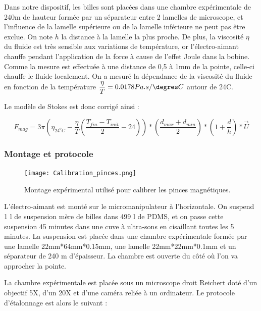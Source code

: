  Dans notre dispositif, les billes sont placées dans une chambre expérimentale de 240\micro m de hauteur formée par un séparateur entre 2 lamelles de microscope, et l'influence de la lamelle supérieure ou de la lamelle inférieure ne peut pas être exclue. On note $h$ la distance à la lamelle la plus proche. 
 De plus, la viscosité $\eta$ du fluide est très sensible aux variations de température, or l'électro-aimant chauffe pendant l'application de la force à cause de l'effet Joule dans la bobine. 
 Comme la mesure est effectuée à une distance de 0,5 à 1mm de la pointe, celle-ci chauffe le fluide localement. 
 On a mesuré la dépendance de la viscosité du fluide en fonction de la température $\dfrac{\eta}{T}=0.0178 Pa.s/\degres C$ autour de 24\degres C. 
 
 Le modèle de Stokes est donc corrigé ainsi : 
 
 \begin{equation}
 {F}_{mag}= 3 \pi \left(\eta_{24^{o}C}-\dfrac{\eta}{T}\left(\frac{T_{fin}-T_{init}}{2} - 24\right) \right) *\left( \frac{d_{max}+d_{min}}{2} \right) * \left( 1+\frac{d}{h} \right)*\vec{U}
 \label{Stokes_corr}
 \end{equation}
 
 \subsubsection{Montage et protocole}
 
 \begin{figure}
 \texttt{[image: Calibration\_pinces.png]}
 \caption{Montage expérimental utilisé pour calibrer les pinces magnétiques.}
 \label{calibration_pinces}
 \end{figure}
 

 
 L'électro-aimant est monté sur le micromanipulateur à l'horizontale.  
 On suspend 1 \micro l de suspension mère de billes dans 499 \micro l de PDMS, et on passe cette suspension 45 minutes dans une cuve à ultra-sons en cisaillant toutes les 5 minutes.
 La suspension est placée dans une chambre expérimentale formée par une lamelle 22mm*64mm*0.15mm, une lamelle 22mm*22mm*0.1mm et un séparateur de 240 \micro m d'épaisseur. La chambre est ouverte du côté où l'on va approcher la pointe. 
 
 La chambre expérimentale est placée sous un microscope droit Reichert doté d'un objectif 5X, d'un 20X et d'une caméra reliée à un ordinateur. Le protocole d'étalonnage est alors le suivant : 
 

